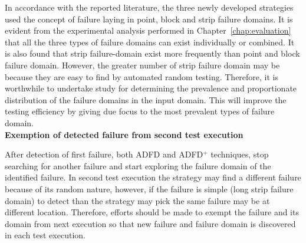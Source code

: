 In accordance with the reported literature, the three newly developed strategies used the concept of failure laying in point, block and strip failure domains. It is evident from the experimental analysis performed in Chapter~\ref{chap:evaluation} that all the three types of failure domains can exist individually or combined. It is also found that strip failure-domain exist more frequently than point and block failure domain. However, the greater number of strip failure domain may be because they are easy to find by automated random testing. Therefore, it is worthwhile to undertake study for determining the prevalence and proportionate distribution of the failure domains in the input domain. This will improve the testing efficiency by giving due focus to the most prevalent types of failure domain.  \\



\textbf{Exemption of detected failure from second test execution}

After detection of first failure, both ADFD and ADFD$^+$ techniques, stop searching for another failure and start exploring the failure domain of the identified failure. In second test execution the strategy may find a different failure because of its random nature, however, if the failure is simple (long strip failure domain) to detect than the strategy may pick the same failure may be at different location. Therefore, efforts should be made to exempt the failure and its domain from next execution so that new failure and failure domain is discovered in each test execution.\\





